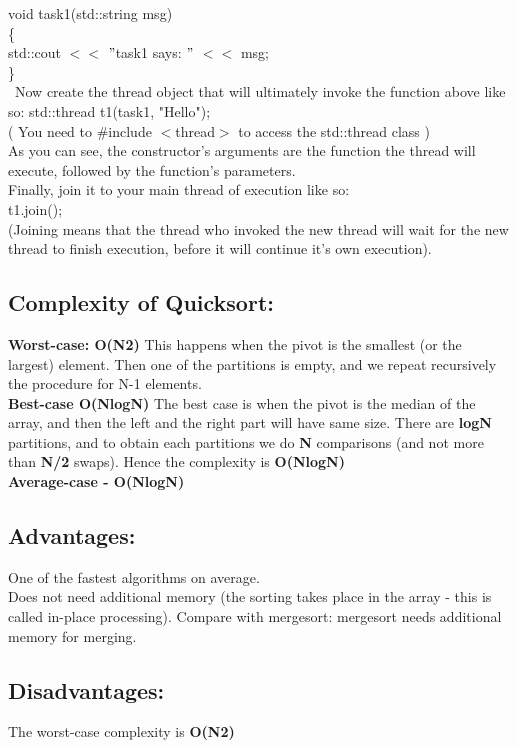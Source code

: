 \documentclass[10pt,a4paper]{article}
\begin{document}
	void task1(std::string msg)\\
	\{\ \\
	std::cout $<<$ $"$task1 says: $"$ $<<$ msg; \\
	\}\\\
	Now create the thread object that will ultimately invoke the function above like so:
	std::thread t1(task1, "Hello");\\
	( You need to \#include $<$thread$>$ to access the std::thread class )\\
	As you can see, the constructor's arguments are the function the thread will execute, followed by the function's parameters.\\
	Finally, join it to your main thread of execution like so:\\
	t1.join(); \\
	(Joining means that the thread who invoked the new thread will wait for the new thread to finish execution, before it will continue it's own execution).\\
	
	\subsection{ Complexity of Quicksort:}
	
	\textbf{Worst-case: O(N2)}
	This happens when the pivot is the smallest (or the largest) element. 
	Then one of the partitions is empty, and we repeat recursively the procedure for N-1 elements.\\
	\textbf{Best-case O(NlogN)} The best case is when the pivot is the median of the array, 
	and then the left and the right part will have same size.
	There are \textbf{logN} partitions, and to obtain each partitions we do \textbf{N} comparisons 
	(and not more than \textbf{N/2} swaps). Hence the complexity is \textbf{O(NlogN)}\\
	\textbf{Average-case - O(NlogN)}
	
	\subsection{ Advantages: }
	One of the fastest algorithms on average. \\
	Does not need additional memory (the sorting takes place in the array - this is called in-place processing). Compare with mergesort: mergesort needs additional memory for merging. 
	\subsection{ Disadvantages:}
	The worst-case complexity is \textbf{ O(N2)}
\end{document}
